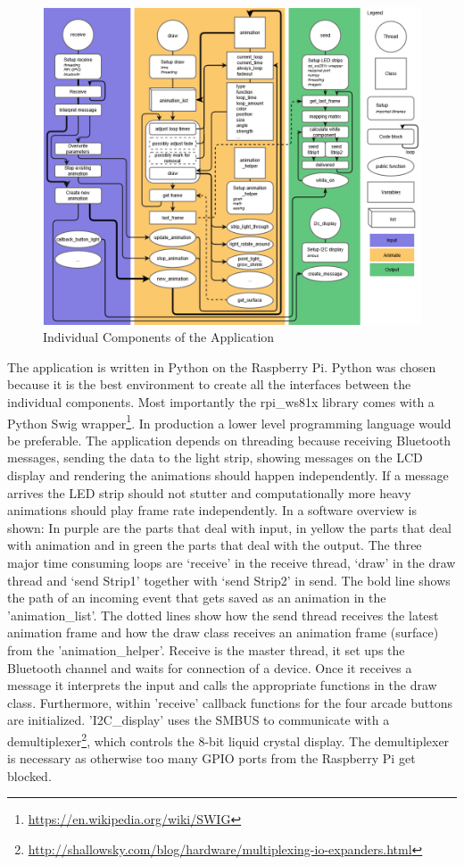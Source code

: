 \begin{figure}
\centering
    \includegraphics[width=1.1\textwidth]{fig/Flow.png}
    \caption[Software Diagram]{Individual Components of the Application}
    \label{fig:software}
\end{figure}
The application is written in Python on the Raspberry Pi. Python was chosen because it is the best environment to create all the interfaces between the individual components. Most importantly the rpi\_ws81x library comes with a Python Swig wrapper\footnote{\url{https://en.wikipedia.org/wiki/SWIG}}. In production a lower level programming language would be preferable. The application depends on threading because receiving Bluetooth messages, sending the data to the light strip, showing messages on the LCD display and rendering the animations should happen independently. If a message arrives the LED strip should not stutter and computationally more heavy animations should play frame rate independently. 
In \emph{} a software overview is shown: In purple are the parts that deal with input, in yellow the parts that deal with animation and in green the parts that deal with the output. The three major time consuming loops are ‘receive’ in the receive thread, ‘draw’ in the draw thread and ‘send Strip1’ together with ‘send Strip2’ in send. The bold line shows the path of an incoming event that gets saved as an animation in the 'animation\_list'. The dotted lines show how the send thread receives the latest animation frame and how the draw class receives an animation frame (surface) from the 'animation\_helper'. 
Receive is the master thread, it set ups the Bluetooth channel and waits for connection of a device. Once it receives a message it interprets the input and calls the appropriate functions in the draw class. Furthermore, within 'receive' callback functions for the four arcade buttons are initialized. 
'I2C\_display' uses the SMBUS to communicate with a demultiplexer\footnote{\url{http://shallowsky.com/blog/hardware/multiplexing-io-expanders.html}}, which controls the 8-bit liquid crystal display. The demultiplexer is necessary as otherwise too many GPIO ports from the Raspberry Pi get blocked. 

